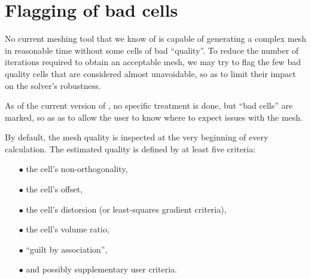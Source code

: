 
%
%
%
%


\nopagebreak

\section*{Flagging of bad cells\label{sec:bad_cells}}

\hypertarget{badcells}{}

No current meshing tool that we know of is capable of generating a complex mesh
in reasonable time without some cells of bad ``quality''.
To reduce the number of iterations required to obtain an acceptable mesh, we may
try to flag the few bad quality cells that are considered almost unavoidable, so
as to limit their impact on the solver's robustness.

As of the current version of \CS, no specific treatment is done, but ``bad cells''
are marked, so as as to allow the user to know where to expect issues with the mesh.

By default, the mesh quality is inspected at the very beginning of every
calculation. The estimated quality is defined by at least five criteria:

\begin{itemize}
\item[$\bullet$] the cell's non-orthogonality,
\item[$\bullet$] the cell's offset,
\item[$\bullet$] the cell's distorsion (or least-squares gradient criteria),
\item[$\bullet$] the cell's volume ratio,
\item[$\bullet$] ``guilt by association'',
\item[$\bullet$] and possibly supplementary user criteria.
\end{itemize}

